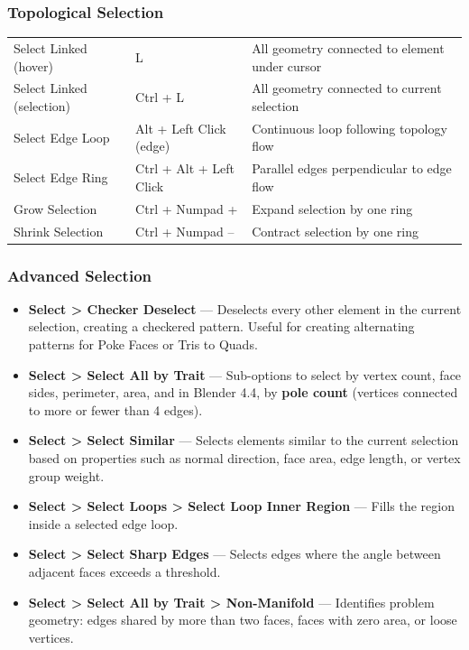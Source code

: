\subsubsection{Topological Selection}

\begin{shortcutbox}
\begin{center}
\begin{tabularx}{\textwidth}{L{4.5cm}C{3.5cm}X}
\toprule
{}
 &  &  \\
\midrule
Select Linked (hover) & L & All geometry connected to element under cursor \\
Select Linked (selection) & Ctrl + L & All geometry connected to current selection \\
Select Edge Loop & Alt + Left Click (edge) & Continuous loop following topology flow \\
Select Edge Ring & Ctrl + Alt + Left Click & Parallel edges perpendicular to edge flow \\
Grow Selection & Ctrl + Numpad + & Expand selection by one ring \\
Shrink Selection & Ctrl + Numpad -- & Contract selection by one ring \\
\bottomrule
\end{tabularx}
\end{center}
\end{shortcutbox}

\subsubsection{Advanced Selection}

\begin{itemize}[leftmargin=2em]
  \item \textbf{Select > Checker Deselect} --- Deselects every other element in the current selection, creating a checkered pattern. Useful for creating alternating patterns for Poke Faces or Tris to Quads.
  \item \textbf{Select > Select All by Trait} --- Sub-options to select by vertex count, face sides, perimeter, area, and in Blender 4.4, by \textbf{pole count} (vertices connected to more or fewer than 4 edges).
  \item \textbf{Select > Select Similar} --- Selects elements similar to the current selection based on properties such as normal direction, face area, edge length, or vertex group weight.
  \item \textbf{Select > Select Loops > Select Loop Inner Region} --- Fills the region inside a selected edge loop.
  \item \textbf{Select > Select Sharp Edges} --- Selects edges where the angle between adjacent faces exceeds a threshold.
  \item \textbf{Select > Select All by Trait > Non-Manifold} --- Identifies problem geometry: edges shared by more than two faces, faces with zero area, or loose vertices.
\end{itemize}

